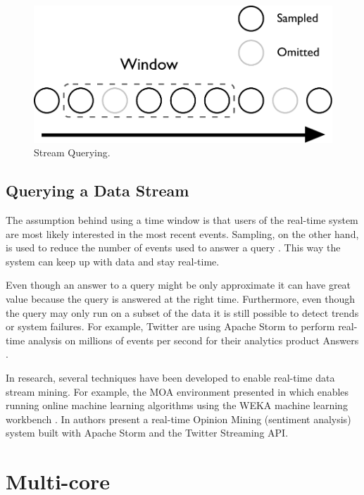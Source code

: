 \documentclass[bsc,twoside,singlespacing,normalheadings,parskip]{infthesis}\usepackage[]{graphicx}\usepackage[]{color}
\begin{document}
\begin{figure}[!htb]
	\centering
	\includegraphics[scale=0.5]{pdf/stream.pdf}
	\caption{Stream Querying.}
	\label{fig:stream}
\end{figure}

\subsection{Querying a Data Stream}

The assumption behind using a time window is that users of the real-time system are most likely interested in the most recent events. Sampling, on the other hand, is used to reduce the number of events used to answer a query \citep{Gaber:2005:MDS:1083784.1083789}. This way the system can keep up with data and stay real-time.

Even though an answer to a query might be only approximate it can have great value because the query is answered at the right time. Furthermore, even though the query may only run on a subset of the data it is still possible to detect trends or system failures. For example, Twitter are using Apache Storm to perform real-time analysis on millions of events per second for their analytics product Answers \citep{Solovey}.

In research, several techniques have been developed to enable real-time data stream mining. For example, the MOA environment presented in \cite{Bifet:2010:MMO:1756006.1859903} which enables running online machine learning algorithms using the WEKA machine learning workbench \citep{Holmes1994}. In \cite{rainatwitter} authors present a real-time Opinion Mining (sentiment analysis) system built with Apache Storm and the Twitter Streaming API.

\section{Multi-core}
\label{sec:multicore}
\end{document}
